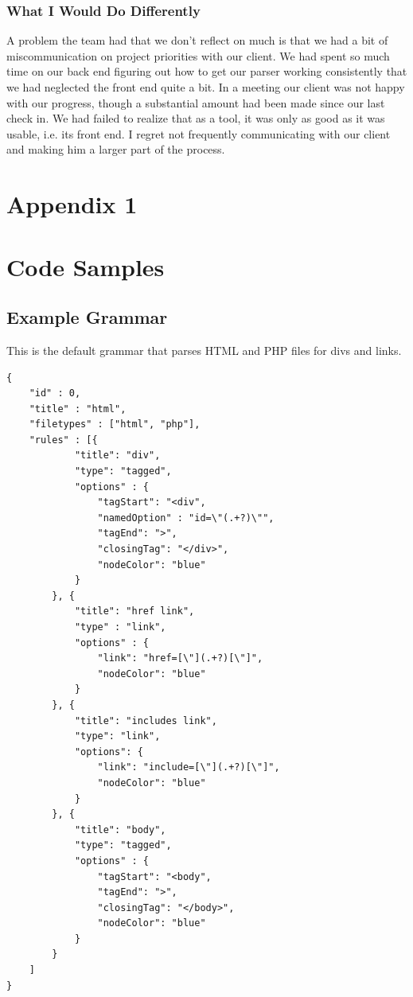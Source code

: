 \documentclass[letterpaper,10pt,titlepage,draftclsnofoot,onecolumn,onesided] {IEEEtran}
\begin{document}
 
\subsubsection{What I Would Do Differently}
A problem the team had that we don't reflect on much is that we had a bit of miscommunication on project priorities with our client. 
We had spent so much time on our back end figuring out how to get our parser working consistently that we had neglected the front end quite a bit. 
In a meeting our client was not happy with our progress, though a substantial amount had been made since our last check in. 
We had failed to realize that as a tool, it was only as good as it was usable, i.e. its front end. 
I regret not frequently communicating with our client and making him a larger part of the process.


\pagebreak
\section{Appendix 1}
\section{Code Samples}
	\subsection{Example Grammar}
	This is the default grammar that parses HTML and PHP files for divs and links.
	
	\begin{lstlisting}
{
    "id" : 0,
    "title" : "html",
    "filetypes" : ["html", "php"],
    "rules" : [{
            "title": "div",
            "type": "tagged",
            "options" : {
                "tagStart": "<div",
                "namedOption" : "id=\"(.+?)\"",
                "tagEnd": ">",
                "closingTag": "</div>",
                "nodeColor": "blue"
            }
        }, {
            "title": "href link",
            "type" : "link",
            "options" : {
                "link": "href=[\"](.+?)[\"]",
                "nodeColor": "blue"
            }
        }, {
            "title": "includes link",
            "type": "link",
            "options": {
                "link": "include=[\"](.+?)[\"]",
                "nodeColor": "blue"
            }
        }, {
            "title": "body",
            "type": "tagged",
            "options" : {
                "tagStart": "<body",
                "tagEnd": ">",
                "closingTag": "</body>",
                "nodeColor": "blue"
            }
        }
    ]
}
	\end{lstlisting}
\end{document}

